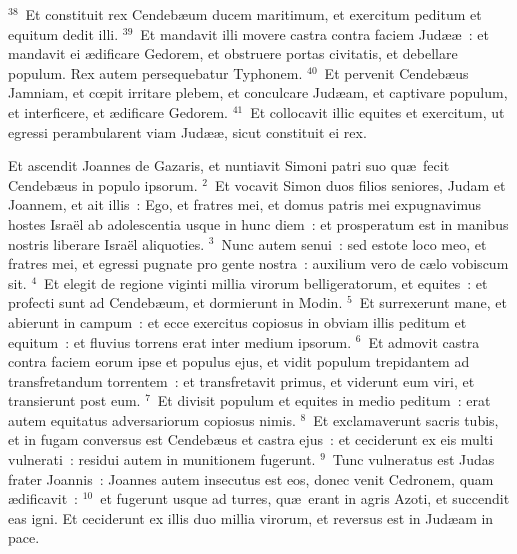 ${}^{38}$~Et constituit rex Cendeb\ae um ducem maritimum, et exercitum peditum et equitum dedit illi.
${}^{39}$~Et mandavit illi movere castra contra faciem Jud\ae \ae~: et mandavit ei \ae dificare Gedorem, et obstruere portas civitatis, et debellare populum. Rex autem persequebatur Typhonem.
${}^{40}$~Et pervenit Cendeb\ae us Jamniam, et cœpit irritare plebem, et conculcare Jud\ae am, et captivare populum, et interficere, et \ae dificare Gedorem.
${}^{41}$~Et collocavit illic equites et exercitum, ut egressi perambularent viam Jud\ae \ae , sicut constituit ei rex.

\lettrine[lines=3,image=true,loversize=0.05,lraise=-0.03]{E}{}t ascendit Joannes de Gazaris, et nuntiavit Simoni patri suo qu\ae\ fecit Cendeb\ae us in populo ipsorum.
${}^{2}$~Et vocavit Simon duos filios seniores, Judam et Joannem, et ait illis~: Ego, et fratres mei, et domus patris mei expugnavimus hostes Isra\"el ab adolescentia usque in hunc diem~: et prosperatum est in manibus nostris liberare Isra\"el aliquoties.
${}^{3}$~Nunc autem senui~: sed estote loco meo, et fratres mei, et egressi pugnate pro gente nostra~: auxilium vero de c\ae lo vobiscum sit.
${}^{4}$~Et elegit de regione viginti millia virorum belligeratorum, et equites~: et profecti sunt ad Cendeb\ae um, et dormierunt in Modin.
${}^{5}$~Et surrexerunt mane, et abierunt in campum~: et ecce exercitus copiosus in obviam illis peditum et equitum~: et fluvius torrens erat inter medium ipsorum.
${}^{6}$~Et admovit castra contra faciem eorum ipse et populus ejus, et vidit populum trepidantem ad transfretandum torrentem~: et transfretavit primus, et viderunt eum viri, et transierunt post eum.
${}^{7}$~Et divisit populum et equites in medio peditum~: erat autem equitatus adversariorum copiosus nimis.
${}^{8}$~Et exclamaverunt sacris tubis, et in fugam conversus est Cendeb\ae us et castra ejus~: et ceciderunt ex eis multi vulnerati~: residui autem in munitionem fugerunt.
${}^{9}$~Tunc vulneratus est Judas frater Joannis~: Joannes autem insecutus est eos, donec venit Cedronem, quam \ae dificavit~:
${}^{10}$~et fugerunt usque ad turres, qu\ae\ erant in agris Azoti, et succendit eas igni. Et ceciderunt ex illis duo millia virorum, et reversus est in Jud\ae am in pace.



